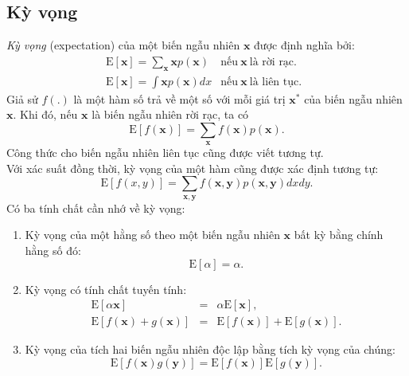 \documentclass[12pt,a4paper,oneside]{report}
\numberwithin{equation}{section}
\begin{document}
\subsection{Kỳ vọng}
\label{sub:expectaion_covariance}
\textit{Kỳ vọng} (expectation) của một biến ngẫu nhiên $\mathbf{x}$ được định nghĩa bởi:
	\begin{eqnarray}
		\label{eqn:30_21}
		\text{E}[\mathbf{x}] = \sum_ \mathbf{x} \mathbf{x} p(\mathbf{x})  & \text{nếu}~\mathbf{ x} ~ \text{là rời rạc.} \quad
		\\
		\label{eqn:30_22}
		\text{E}[\mathbf{x}] = \int \mathbf{x} p(\mathbf{x}) dx  & \text{nếu}~ \mathbf{x} ~ \text{là liên tục.}
	\end{eqnarray}
Giả sử $f(.)$ là một hàm số trả về một số với mỗi giá trị $\mathbf{x^*}$ của biến ngẫu
nhiên $\mathbf{x}$. Khi đó, nếu $\mathbf{x}$ là biến ngẫu nhiên rời rạc, ta có
\begin{equation}
	\label{eqn:30_23}
	\text{E}[f(\mathbf{x})] = \sum_\mathbf{x} f(\mathbf{x}) p(\mathbf{x}).
\end{equation}
Công thức cho biến ngẫu nhiên liên tục cũng được viết tương tự.\\
Với xác suất đồng thời, kỳ vọng của một hàm cũng được xác định tương tự:
\begin{equation}
	\label{eqn:30_24}
	\text{E}[f(x, y)] = \sum_{\mathbf{x,y}} f(\mathbf{x, y}) p(\mathbf{x, y}) dx dy.
\end{equation}
Có ba tính chất cần nhớ về kỳ vọng:
\begin{enumerate}
	\item Kỳ vọng của một hằng số theo một biến ngẫu nhiên $\mathbf{x}$ bất kỳ bằng chính hằng số đó:
	\begin{equation}
		\label{eqn:30_25}
		\text{E}[\alpha] = \alpha.
	\end{equation}
	\item Kỳ vọng có tính chất tuyến tính:
	\begin{eqnarray}
		\label{eqn:30_26}
		\text{E}[\alpha \mathbf{x}] & = & \alpha \text{E}[\mathbf{x}],  \\
		\label{eqn:30_27}
		\text{E}[f(\mathbf{x}) + g(\mathbf{x})] & = & \text{E}[f(\mathbf{x})] + \text{E}[g(\mathbf{x})].
	\end{eqnarray}
	\item Kỳ vọng của tích hai biến ngẫu nhiên độc lập bằng tích kỳ vọng của chúng:
	\begin{equation}
		\label{eqn:30_28}
		\text{E}[f(\mathbf{x}) g(\mathbf{y})] = \text{E}[f(\mathbf{x})] \text{E}[g(\mathbf{y})].
	\end{equation}
	
\end{enumerate}
\end{document}
